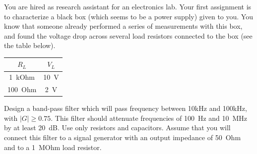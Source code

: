 \documentclass[letterpaper,addpoints,answers]{exam}
\begin{document}
\begin{questions}
\pagebreak

\question
You are hired as research assistant for an electronics lab. Your first
assignment is to characterize a black box (which seems to be a power
supply) given to you.  
You know that someone already performed a series of measurements
with this box, and found the voltage drop across several load resistors
connected to the box (see the table below).

\begin{tabular}{|c|c|}
\hline$R_L$	  &  $V_L$ \\ 
\hline
1~kOhm	&  10~V \\
100~Ohm &  2~V \\
\hline
\end{tabular}


\question
Design a band-pass filter  which will pass frequency between 10kHz and
100kHz, with $|G| \ge  0.75$. This filter should attenuate frequencies of
100~Hz and 10~MHz by at least 20~dB. Use only resistors and capacitors.
Assume that you will connect this filter to a signal generator with
an output impedance of 50~Ohm and to a 1~MOhm load resistor.
\end{questions}
\end{document}
